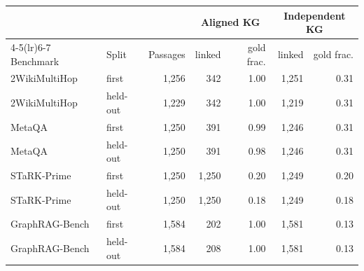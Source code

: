 \begin{tabular}{llrrrrr}
\toprule
 & & & \multicolumn{2}{c}{Aligned KG} & \multicolumn{2}{c}{Independent KG}\\
\cmidrule(lr){4-5}\cmidrule(lr){6-7}
Benchmark & Split & Passages & linked & gold frac. & linked & gold frac.\\
\midrule
2WikiMultiHop & first & 1{,}256 & 342 & 1.00 & 1{,}251 & 0.31\\
2WikiMultiHop & held-out & 1{,}229 & 342 & 1.00 & 1{,}219 & 0.31\\
MetaQA & first & 1{,}250 & 391 & 0.99 & 1{,}246 & 0.31\\
MetaQA & held-out & 1{,}250 & 391 & 0.98 & 1{,}246 & 0.31\\
STaRK-Prime & first & 1{,}250 & 1{,}250 & 0.20 & 1{,}249 & 0.20\\
STaRK-Prime & held-out & 1{,}250 & 1{,}250 & 0.18 & 1{,}249 & 0.18\\
GraphRAG-Bench & first & 1{,}584 & 202 & 1.00 & 1{,}581 & 0.13\\
GraphRAG-Bench & held-out & 1{,}584 & 208 & 1.00 & 1{,}581 & 0.13\\
\bottomrule
\end{tabular}
